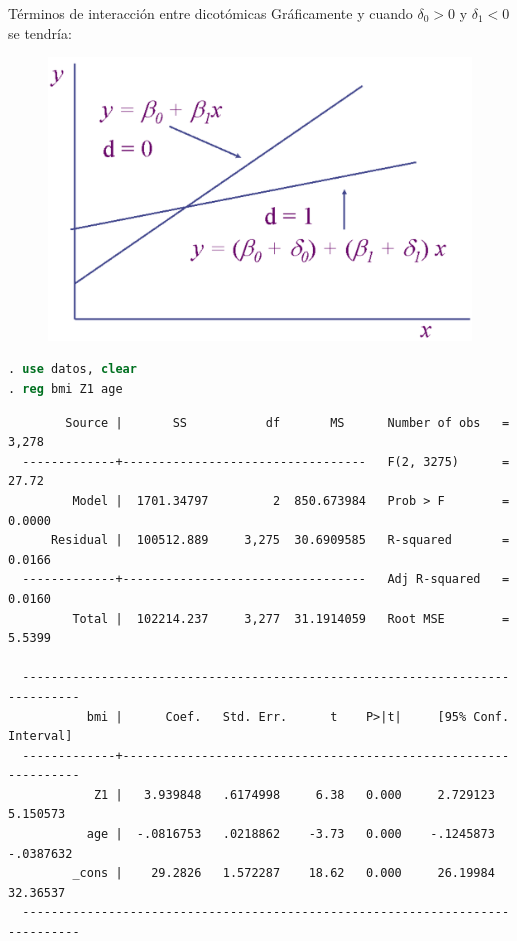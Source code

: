 \begin{frame}{Términos de interacción entre dicotómicas}
	Gráficamente y cuando $\delta_{0}>0$ y $\delta_{1}<0$ se tendrí­a:
    	\begin{figure}[H]
    		\begin{centering}
    		  \includegraphics[width = 0.8\linewidth]{fig/dummy2.png}
    		\end{centering}
    	\end{figure}
\end{frame}
\begin{frame}[fragile]
	\begin{lstlisting}[language=Stata, numbers=none]
. use datos, clear
. reg bmi Z1 age
	\end{lstlisting}
	\scriptsize{
		\begin{verbatim}
        Source |       SS           df       MS      Number of obs   =     3,278
  -------------+----------------------------------   F(2, 3275)      =     27.72
         Model |  1701.34797         2  850.673984   Prob > F        =    0.0000
      Residual |  100512.889     3,275  30.6909585   R-squared       =    0.0166
  -------------+----------------------------------   Adj R-squared   =    0.0160
         Total |  102214.237     3,277  31.1914059   Root MSE        =    5.5399
  
  ------------------------------------------------------------------------------
           bmi |      Coef.   Std. Err.      t    P>|t|     [95% Conf. Interval]
  -------------+----------------------------------------------------------------
            Z1 |   3.939848   .6174998     6.38   0.000     2.729123    5.150573
           age |  -.0816753   .0218862    -3.73   0.000    -.1245873   -.0387632
         _cons |    29.2826   1.572287    18.62   0.000     26.19984    32.36537
  ------------------------------------------------------------------------------
		\end{verbatim}
	}
\end{frame}
